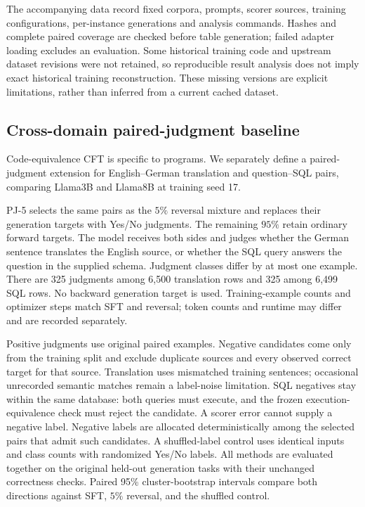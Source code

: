 The accompanying data record fixed corpora, prompts, scorer sources, training configurations,
per-instance generations and analysis commands. Hashes and complete paired coverage are
checked before table generation; failed adapter loading excludes an evaluation. Some
historical training code and upstream dataset revisions were not retained, so reproducible
result analysis does not imply exact historical training reconstruction. These missing
versions are explicit limitations, rather than inferred from a current cached dataset.

\subsection{Cross-domain paired-judgment baseline}
\label{app:paired-judgment-method}
Code-equivalence CFT is specific to programs. We separately define a paired-judgment
extension for English--German translation and question--SQL pairs, comparing Llama3B
and Llama8B at training seed 17.

PJ-5 selects the same pairs as the $5\%$ reversal mixture and replaces their generation
targets with Yes/No judgments. The remaining $95\%$ retain ordinary forward targets.
The model receives both sides and judges whether the German sentence translates the
English source, or whether the SQL query answers the question in the supplied schema.
Judgment classes differ by at most one example. There are 325 judgments among 6,500
translation rows and 325 among 6,499 SQL rows. No backward generation target is used.
Training-example counts and optimizer steps match SFT and reversal; token counts and
runtime may differ and are recorded separately.

Positive judgments use original paired examples. Negative candidates come only from the
training split and exclude duplicate sources and every observed correct target for that
source. Translation uses mismatched training sentences; occasional unrecorded semantic
matches remain a label-noise limitation. SQL negatives stay within the same database:
both queries must execute, and the frozen execution-equivalence check must reject the
candidate. A scorer error cannot supply a negative label. Negative labels are allocated
deterministically among the selected pairs that admit such candidates. A shuffled-label
control uses identical inputs and class counts with randomized Yes/No labels.
All methods are evaluated together on the original held-out generation tasks with their
unchanged correctness checks. Paired 95\% cluster-bootstrap intervals compare both
directions against SFT, $5\%$ reversal, and the shuffled control.
